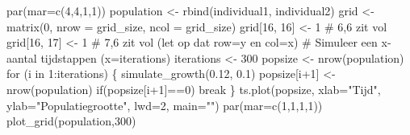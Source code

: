\documentclass[
  a4paper,
]{scrbook}
\newenvironment{Shaded}{\begin{snugshade}}{\end{snugshade}}
\newcommand{\AttributeTok}[1]{\textcolor[rgb]{0.40,0.45,0.13}{#1}}
\newcommand{\CommentTok}[1]{\textcolor[rgb]{0.37,0.37,0.37}{#1}}
\newcommand{\ControlFlowTok}[1]{\textcolor[rgb]{0.00,0.23,0.31}{#1}}
\newcommand{\DecValTok}[1]{\textcolor[rgb]{0.68,0.00,0.00}{#1}}
\newcommand{\FloatTok}[1]{\textcolor[rgb]{0.68,0.00,0.00}{#1}}
\newcommand{\FunctionTok}[1]{\textcolor[rgb]{0.28,0.35,0.67}{#1}}
\newcommand{\NormalTok}[1]{\textcolor[rgb]{0.00,0.23,0.31}{#1}}
\newcommand{\OtherTok}[1]{\textcolor[rgb]{0.00,0.23,0.31}{#1}}
\newcommand{\SpecialCharTok}[1]{\textcolor[rgb]{0.37,0.37,0.37}{#1}}
\newcommand{\StringTok}[1]{\textcolor[rgb]{0.13,0.47,0.30}{#1}}
\theoremstyle{definition}
\theoremstyle{remark}
\begin{document}
\begin{Shaded}
\begin{Highlighting}[]
\FunctionTok{par}\NormalTok{(}\AttributeTok{mar=}\FunctionTok{c}\NormalTok{(}\DecValTok{4}\NormalTok{,}\DecValTok{4}\NormalTok{,}\DecValTok{1}\NormalTok{,}\DecValTok{1}\NormalTok{))}
\NormalTok{population }\OtherTok{\textless{}{-}} \FunctionTok{rbind}\NormalTok{(individual1, individual2)}
\NormalTok{grid }\OtherTok{\textless{}{-}} \FunctionTok{matrix}\NormalTok{(}\DecValTok{0}\NormalTok{, }\AttributeTok{nrow =}\NormalTok{ grid\_size, }\AttributeTok{ncol =}\NormalTok{ grid\_size)}
\NormalTok{grid[}\DecValTok{16}\NormalTok{, }\DecValTok{16}\NormalTok{] }\OtherTok{\textless{}{-}} \DecValTok{1} \CommentTok{\# 6,6 zit vol}
\NormalTok{grid[}\DecValTok{16}\NormalTok{, }\DecValTok{17}\NormalTok{] }\OtherTok{\textless{}{-}} \DecValTok{1} \CommentTok{\# 7,6 zit vol (let op dat row=y en col=x)}
\CommentTok{\# Simuleer een x{-}aantal tijdstappen (x=iterations)}
\NormalTok{iterations }\OtherTok{\textless{}{-}} \DecValTok{300}
\NormalTok{popsize }\OtherTok{\textless{}{-}} \FunctionTok{nrow}\NormalTok{(population)}
\ControlFlowTok{for}\NormalTok{ (i }\ControlFlowTok{in} \DecValTok{1}\SpecialCharTok{:}\NormalTok{iterations) \{}
  \FunctionTok{simulate\_growth}\NormalTok{(}\FloatTok{0.12}\NormalTok{, }\FloatTok{0.1}\NormalTok{)}
\NormalTok{  popsize[i}\SpecialCharTok{+}\DecValTok{1}\NormalTok{] }\OtherTok{\textless{}{-}} \FunctionTok{nrow}\NormalTok{(population)}
  \ControlFlowTok{if}\NormalTok{(popsize[i}\SpecialCharTok{+}\DecValTok{1}\NormalTok{]}\SpecialCharTok{==}\DecValTok{0}\NormalTok{) }\ControlFlowTok{break}
\NormalTok{\}}
\FunctionTok{ts.plot}\NormalTok{(popsize, }\AttributeTok{xlab=}\StringTok{"Tijd"}\NormalTok{, }\AttributeTok{ylab=}\StringTok{"Populatiegrootte"}\NormalTok{, }\AttributeTok{lwd=}\DecValTok{2}\NormalTok{, }\AttributeTok{main=}\StringTok{""}\NormalTok{)}
\FunctionTok{par}\NormalTok{(}\AttributeTok{mar=}\FunctionTok{c}\NormalTok{(}\DecValTok{1}\NormalTok{,}\DecValTok{1}\NormalTok{,}\DecValTok{1}\NormalTok{,}\DecValTok{1}\NormalTok{))}
\FunctionTok{plot\_grid}\NormalTok{(population,}\DecValTok{300}\NormalTok{)}
\end{Highlighting}
\end{Shaded}
\end{document}

